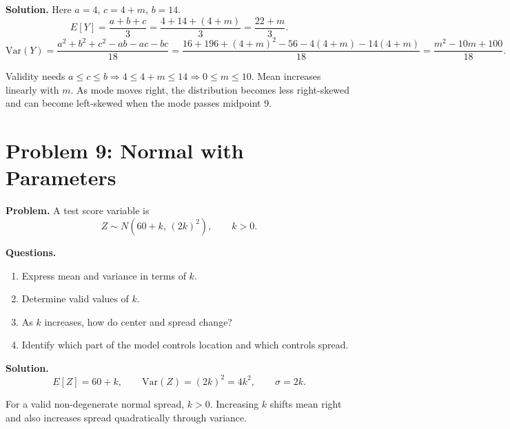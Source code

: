 \textbf{Solution.}
Here \(a=4\), \(c=4+m\), \(b=14\).
\[
E[Y]=\frac{a+b+c}{3}=\frac{4+14+(4+m)}{3}=\frac{22+m}{3}.
\]
\[
\mathrm{Var}(Y)=\frac{a^2+b^2+c^2-ab-ac-bc}{18}
=\frac{16+196+(4+m)^2-56-4(4+m)-14(4+m)}{18}
=\frac{m^2-10m+100}{18}.
\]
\begin{center}
\end{center}
Validity needs \(a\le c\le b\Rightarrow 4\le 4+m\le 14\Rightarrow 0\le m\le 10\).
Mean increases linearly with \(m\). As mode moves right, the distribution becomes less right-skewed and can become left-skewed when the mode passes midpoint 9.

\section{Problem 9: Normal with Parameters}

\textbf{Problem.}
A test score variable is
\[
Z\sim N(60+k,\,(2k)^2),\qquad k>0.
\]

\textbf{Questions.}
\begin{enumerate}
  \item Express mean and variance in terms of \(k\).
  \item Determine valid values of \(k\).
  \item As \(k\) increases, how do center and spread change?
  \item Identify which part of the model controls location and which controls spread.
\end{enumerate}

\textbf{Solution.}
\[
E[Z]=60+k,
\qquad
\mathrm{Var}(Z)=(2k)^2=4k^2,
\qquad
\sigma=2k.
\]
\begin{center}
\end{center}
For a valid non-degenerate normal spread, \(k>0\). Increasing \(k\) shifts mean right and also increases spread quadratically through variance.


